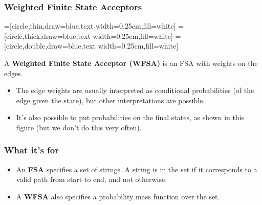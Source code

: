 \documentclass{beamer}
\begin{document}
\begin{frame}
  \frametitle{Weighted Finite State Acceptors}
  \begin{center}
    =[circle,thin,draw=blue,text width=0.25cm,fill=white]
    =[circle,thick,draw=blue,text width=0.25cm,fill=white]
    =[circle,double,draw=blue,text width=0.25cm,fill=white]    
  \end{center}
  
  A {\bf Weighted Finite State Acceptor (WFSA)} is an FSA with weights
  on the edges.
  \begin{itemize}
  \item The edge weights are usually interpreted as conditional probabilities (of the
    edge given the state), but other interpretations are possible.
  \item It's also possible to put probabilities on the final states,
    as shown in this figure (but we don't do this very often).
  \end{itemize}
\end{frame}

\begin{frame}
  \frametitle{What it's for}
  \begin{itemize}
  \item An {\bf FSA} specifies a set of strings.  A string is in the set if
    it corresponds to a valid path from start to end, and not otherwise.
  \item A {\bf WFSA} also specifies a probability mass function over the set.
  \end{itemize}
\end{frame}
\end{document}
